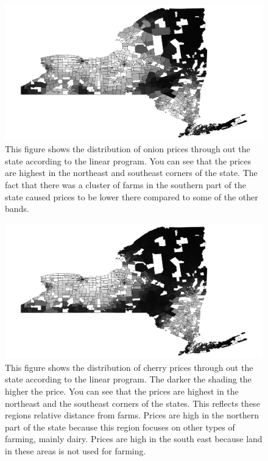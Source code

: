 \documentclass{report}
\begin{document}
\begin{figure}
\centering
\begin{framed}
\includegraphics[scale=.50]{prices_49}
\caption{This figure shows the distribution of onion prices through out the state according to the linear program. You can see that the prices are highest in the northeast and southeast corners of the state. The fact that there was a cluster of farms in the southern part of the state caused prices to be lower there compared to some of the other bands.}
\label{fig:prices_49}
\end{framed}
\end{figure}


\begin{figure}
\centering
\begin{framed}
\includegraphics[scale=.50]{prices_66}
\caption{This figure shows the distribution of cherry prices through out the state according to the linear program. The darker the shading the higher the price. You can see that the prices are highest in the northeast and the southeast corners of the states. This reflects these regions relative distance from farms. Prices are high in the northern part of the state because this region focuses on other types of farming, mainly dairy. Prices are high in the south east because land in these areas is not used for farming. }
\label{fig:prices_66}
\end{framed}
\end{figure}
\end{document}
